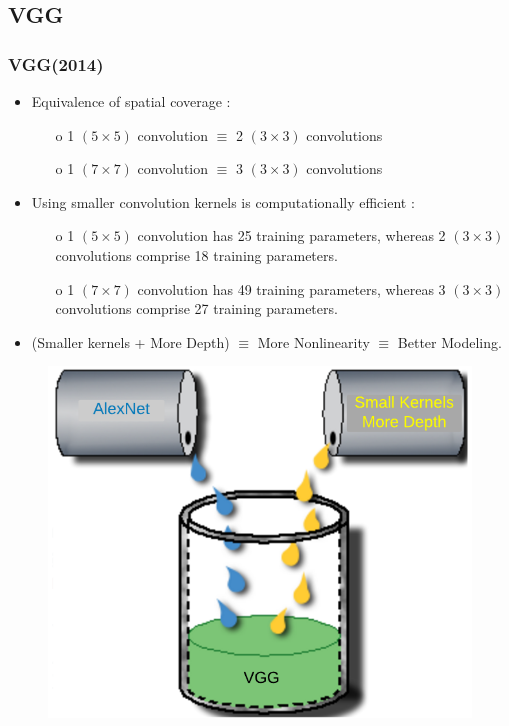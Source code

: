 \documentclass[9pt]{beamer}
\begin{document}
\subsection{VGG}
\begin{frame}
	\frametitle{VGG(2014)}
		\begin{itemize}
			\item Equivalence of spatial coverage :
				\begin{itemize}
					\item[o] 1 $(5\times 5)$ convolution $\equiv$ 2 $(3\times 3)$ convolutions
					\item[o] 1 $(7\times 7)$ convolution $\equiv$ 3 $(3\times 3)$ convolutions
				\end{itemize} 
			\item Using smaller convolution kernels is computationally efficient :
				\begin{itemize}
					\item[o] 1 $(5\times 5)$ convolution has 25 training parameters, whereas 2 $(3\times 3)$ convolutions comprise 18 training parameters.
					\item[o] 1 $(7\times 7)$ convolution has 49 training parameters, whereas 3 $(3\times 3)$ convolutions comprise 27 training parameters.
				\end{itemize} 				
			\item (Smaller kernels + More Depth) $\equiv$ More Nonlinearity $\equiv$ Better Modeling.					
		\end{itemize}
		\pause
		\begin{figure}
			\includegraphics[scale=1.0]{./figures/edit/vgg_mixture.png}
		\end{figure}			
\end{frame}
\end{document}
